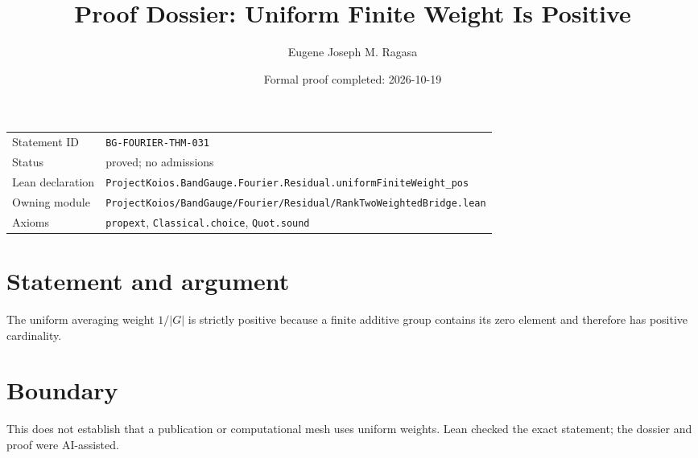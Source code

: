 \documentclass[11pt]{article}
\title{Proof Dossier: Uniform Finite Weight Is Positive}
\author{Eugene Joseph M. Ragasa}
\date{Formal proof completed: 2026-10-19}
\begin{document}
\maketitle
\noindent\begin{tabularx}{\textwidth}{@{}lX@{}}\toprule
Statement ID & \texttt{BG-FOURIER-THM-031} \\
Status & proved; no admissions \\
Lean declaration & \texttt{ProjectKoios.BandGauge.Fourier.Residual.uniformFiniteWeight\_pos} \\
Owning module & \texttt{ProjectKoios/BandGauge/Fourier/Residual/RankTwoWeightedBridge.lean} \\
Axioms & \texttt{propext}, \texttt{Classical.choice}, \texttt{Quot.sound} \\
\bottomrule\end{tabularx}
\section{Statement and argument}
The uniform averaging weight $1/|G|$ is strictly positive because a finite additive group contains its zero element and therefore has positive cardinality.
\section{Boundary}
This does not establish that a publication or computational mesh uses uniform weights. Lean checked the exact statement; the dossier and proof were AI-assisted.
\end{document}
